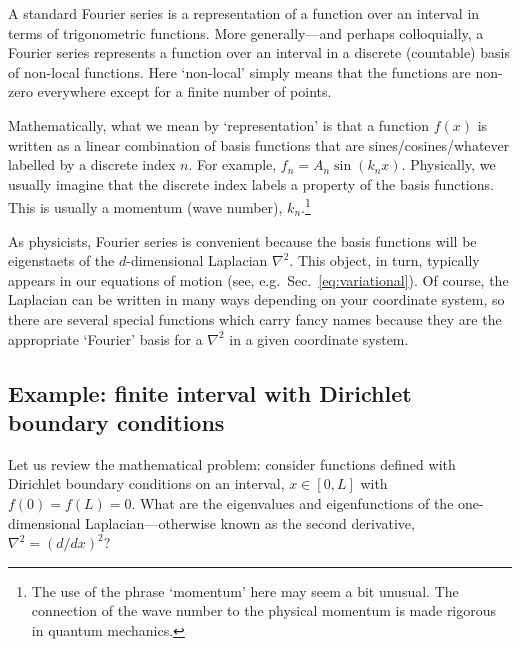 A standard Fourier series is a representation of a function over an interval in terms of trigonometric functions. More generally---and perhaps colloquially, a Fourier series represents a function over an interval in a discrete (countable) basis of non-local functions. Here `non-local' simply means that the functions are non-zero everywhere except for a finite number of points. 

Mathematically, what we mean by `representation' is that a function $f(x)$ is written as a linear combination of basis functions that are sines/cosines/whatever labelled by a discrete index $n$. For example, $f_n = A_n \sin(k_n x)$. Physically, we usually imagine that the discrete index labels a property of the basis functions. This is usually a momentum (wave number), $k_n$.\footnote{The use of the phrase `momentum' here may seem a bit unusual. The connection of the wave number to the physical momentum is made rigorous in quantum mechanics.} 

As physicists, Fourier series is convenient because the basis functions will be eigenstaets of the $d$-dimensional Laplacian $\nabla^2$. This object, in turn, typically appears in our equations of motion (see, e.g.\ Sec.~\ref{eq:variational}). Of course, the Laplacian can be written in many ways depending on your coordinate system, so there are several special functions which carry fancy names because they are the appropriate `Fourier' basis for a $\nabla^2$ in a given coordinate system. 

\subsection{Example: finite interval with Dirichlet boundary conditions}

Let us review the mathematical problem: consider functions defined with Dirichlet boundary conditions on an interval, $x\in[0,L]$ with $f(0)=f(L)=0$. What are the eigenvalues and eigenfunctions of the one-dimensional Laplacian---otherwise known as the second derivative, $\nabla^2 = (d/dx)^2$?

